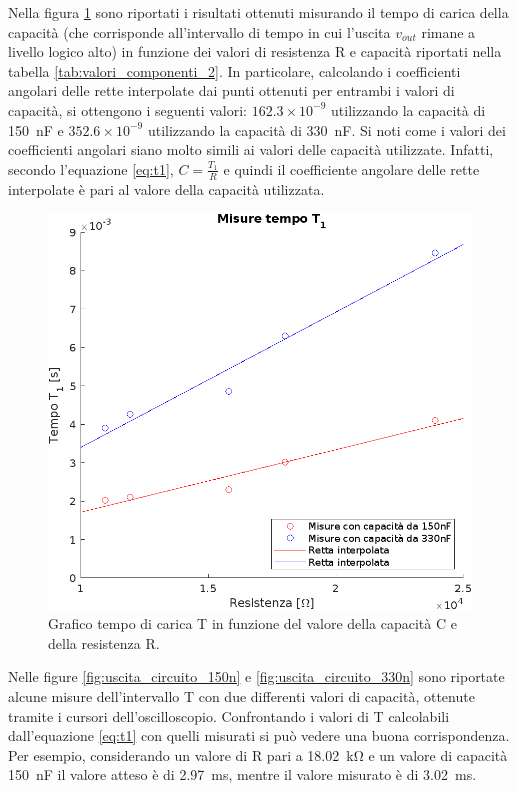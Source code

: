 \noindent
Nella figura \ref{fig:misure_t1} sono riportati i risultati ottenuti misurando il tempo di carica della capacità (che corrisponde all'intervallo di tempo in cui l'uscita $v_{out}$ rimane a livello logico alto) in funzione dei valori di resistenza R e capacità riportati nella tabella \ref{tab:valori_componenti_2}. In particolare, calcolando i coefficienti angolari delle rette interpolate dai punti ottenuti per entrambi i valori di capacità, si ottengono i seguenti valori: $162.3 \times 10^{-9}$ utilizzando la capacità di \SI{150}{\nano\farad} e $352.6 \times 10^{-9}$ utilizzando la capacità di \SI{330}{\nano\farad}. Si noti come i valori dei coefficienti angolari siano molto simili ai valori delle capacità utilizzate. Infatti, secondo l'equazione \ref{eq:t1}, $C=\frac{T_1}{R}$ e quindi il coefficiente angolare delle rette interpolate è pari al valore della capacità utilizzata.
\begin{figure}[h]
	\centering
	\includegraphics[width=0.5\linewidth]{./ImageFiles/Laboratorio 4/Misure tempo t1}
	\caption{Grafico tempo di carica T in funzione del valore della capacità C e della resistenza R.}
	\label{fig:misure_t1}
\end{figure}
Nelle figure \ref{fig:uscita_circuito_150n} e \ref{fig:uscita_circuito_330n} sono riportate alcune misure dell'intervallo T con due differenti valori di capacità, ottenute tramite i cursori dell'oscilloscopio. Confrontando i valori di T calcolabili dall'equazione \ref{eq:t1} con quelli misurati si può vedere una buona corrispondenza. Per esempio, considerando un valore di R pari a \SI{18.02}{\kilo\ohm} e un valore di capacità \SI{150}{\nano\farad} il valore atteso è di \SI{2.97}{\milli\second}, mentre il valore misurato è di \SI{3.02}{\milli\second}. 

